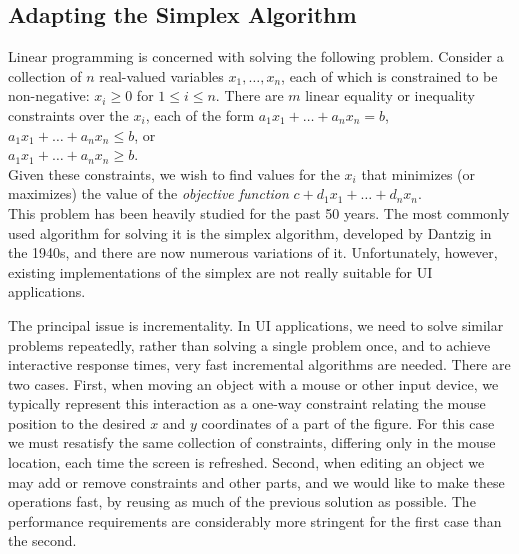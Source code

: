 \documentclass{uist96}
\newcommand{\ignore}[1]{}
\begin{document}
\subsection{Adapting the Simplex Algorithm}

Linear programming is concerned with solving the following problem.  Consider
a collection of $n$ real-valued variables $x_1, \ldots, x_n$, each
of which  is constrained to be non-negative: 
$x_i \geq 0$ for $1 \leq i \leq n$.  There are  $m$
linear equality or inequality constraints over the $x_i$, each of the form
\hspace*{5mm}\mbox{$a_1 x_1 + \ldots + a_n x_n = b$},\\
\hspace*{5mm}\mbox{$a_1 x_1 + \ldots + a_n x_n \leq b$},  or\\
\hspace*{5mm}\mbox{$a_1 x_1 + \ldots + a_n x_n \geq b$}.\\
Given these constraints, we wish to find values for the $x_i$ that minimizes 
(or maximizes) the value of the {\em objective function}
\hspace*{5mm}$c + d_1 x_1 + \ldots + d_n x_n$. \\
This problem has been heavily studied for the past 50 years.  The most
commonly used algorithm for solving it is the simplex algorithm, developed
by Dantzig in the 1940s, and there are now numerous variations of it. 
Unfortunately, however, existing implementations of the simplex
are not really suitable for UI applications.

The principal issue is incrementality.  In UI
applications, we need to solve similar problems repeatedly, rather than
solving a single problem once, and to achieve interactive response times,
very fast incremental algorithms are needed.  There are two cases.  First, when
moving an object with a mouse or other input device, we typically represent
this interaction as a one-way constraint relating the mouse position to the
desired $x$ and $y$ coordinates of a part of the figure.  For this case we
must resatisfy the same collection of constraints, differing only in the
mouse location, each time the screen is refreshed.  Second, when editing an
object we may add or remove constraints and other parts, and we would like
to make these operations fast, by reusing as much of the previous solution
as possible.  The performance requirements are considerably more stringent
for the first case than the second.  
\ignore{In Sections \ref{resolving} and
\ref{quadratic} we describe how to update an existing solution rapidly
given new inputs (e.g.\ a new mouse position), while in Sections
\ref{adding-constraints} and \ref{removing-constraints} we describe how to
add or delete a constraint incrementally.}
\end{document}
